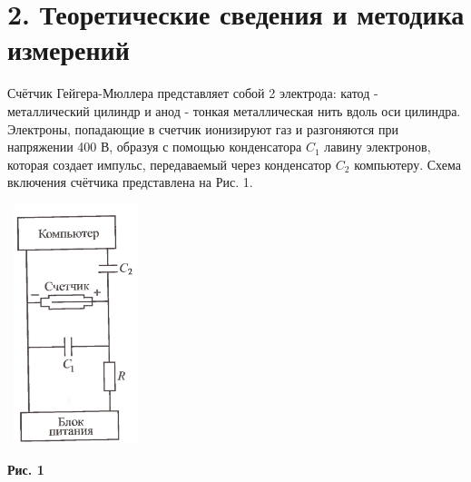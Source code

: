 \section* {2. Теоретические сведения и методика измерений}


Счётчик Гейгера-Мюллера представляет собой 2 электрода: катод - металлический цилиндр и анод - тонкая металлическая нить вдоль оси цилиндра.
Электроны, попадающие в счетчик ионизируют газ и разгоняются при напряжении 400 В, образуя с помощью конденсатора $C_1$ лавину электронов, которая создает импульс, передаваемый через конденсатор $C_2$ компьютеру.
Схема включения счётчика представлена на Рис. 1.


\begin{center}
    \includegraphics[width=4cm, height=7cm]{gayger.png}
\end{center}
\begin{center}
    {\scriptsize \textbf{Рис. 1} }
\end{center}


